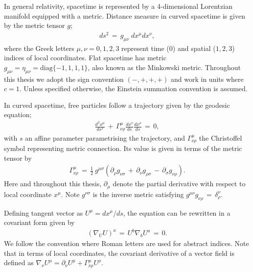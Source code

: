In general relativity, spacetime is represented by a 4-dimensional Lorentzian manifold equipped with a metric. Distance measure in curved spacetime is given by the metric tensor $g$;
\begin{align}
	ds^2 \,=\, g_{\mu \nu} \; dx^\mu dx^\nu	,
\end{align}
where the Greek letters $\mu, \nu = 0,1,2,3$ represent time ($0$) and spatial ($1,2,3$) indices of local coordinates. Flat spacetime has metric $g_{\mu\nu} = \eta_{\mu\nu} = \text{diag}\{-1, 1, 1, 1\}$, also known as the Minkowski metric. Throughout this thesis we adopt the sign convention $(-, +, +, +)$ and work in units where $c=1$. Unless specified otherwise, the Einstein summation convention is assumed. 

In curved spacetime, free particles follow a trajectory given by the geodesic equation;
\begin{align}
	\frac{d^2x^\mu}{ds^2} \,+\, \Gamma^\mu_{\nu \rho} \frac{dx^\nu}{ds} \frac{dx^\rho}{ds} \,=\, 0,  \label{eqn:geodesic}
\end{align}
with $s$ an affine parameter parametrising the trajectory, and $\Gamma^\mu_{\nu\rho}$ the Christoffel symbol representing metric connection. Its value is given in terms of the metric tensor by
\begin{align}
	\Gamma^{\mu}_{\nu\rho} \,=\, \frac{1}{2}~ g^{\mu\sigma} \left( \partial_\rho g_{\nu\sigma} \,+\, \partial_\nu g_{\rho\sigma} \,-\, \partial_\sigma g_{\nu\rho}  \right). \label{def:Levi_Civita}
\end{align}
Here and throughout this thesis, $\partial_\mu$ denote the partial derivative with respect to local coordinate $x^\mu$. Note $g^{\nu\sigma}$ is the inverse metric satisfying $g^{\mu\nu} g_{\nu\rho} \,=\, \delta^\nu_\rho$.

Defining tangent vector as $U^\mu = dx^\mu / ds$, the equation can be rewritten in a covariant form given by
\begin{align}
	\left( \nabla_U U \right)^a \,=\, U^b \nabla_b U^a \,=\, 0.
\end{align}
We follow the convention where Roman letters are used for abstract indices. Note that in terms of local coordinates, the covariant derivative of a vector field is defined as $\nabla_\nu U^\mu = \partial_\nu U^\mu + \Gamma^\mu_{\nu\rho} U^\rho$.

